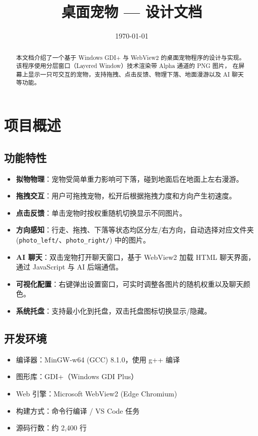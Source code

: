 \documentclass[12pt,a4paper]{ctexart}
\title{\vspace{-2cm}桌面宠物 --- 设计文档}
\author{}
\date{\today}
\begin{document}
\maketitle
\thispagestyle{empty}

\begin{abstract}
本文档介绍了一个基于 Windows GDI+ 与 WebView2 的桌面宠物程序的设计与实现。
该程序使用分层窗口（Layered Window）技术渲染带 Alpha 通道的 PNG 图片，
在屏幕上显示一只可交互的宠物，支持拖拽、点击反馈、物理下落、地面漫游以及 AI 聊天等功能。
\end{abstract}

\tableofcontents
\newpage

\section{项目概述}

\subsection{功能特性}
\begin{itemize}
    \item \textbf{拟物物理}：宠物受简单重力影响可下落，碰到地面后在地面上左右漫游。
    \item \textbf{拖拽交互}：用户可拖拽宠物，松开后根据拖拽力度和方向产生初速度。
    \item \textbf{点击反馈}：单击宠物时按权重随机切换显示不同图片。
    \item \textbf{方向感知}：行走、拖拽、下落等状态均区分左/右方向，自动选择对应文件夹 (\texttt{photo\_left/}、\texttt{photo\_right/}) 中的图片。
    \item \textbf{AI 聊天}：双击宠物打开聊天窗口，基于 WebView2 加载 HTML 聊天界面\cite{MidsummerBird}，通过 JavaScript 与 AI 后端通信。
    \item \textbf{可视化配置}：右键弹出设置窗口，可实时调整各图片的随机权重以及聊天颜色。
    \item \textbf{系统托盘}：支持最小化到托盘，双击托盘图标切换显示/隐藏。
\end{itemize}

\subsection{开发环境}
\begin{itemize}
    \item 编译器：MinGW-w64 (GCC) 8.1.0，使用 g++ 编译
    \item 图形库：GDI+（Windows GDI Plus）
    \item Web 引擎：Microsoft WebView2 (Edge Chromium)
    \item 构建方式：命令行编译 / VS Code 任务
    \item 源码行数：约 2,400 行
\end{itemize}
\end{document}
